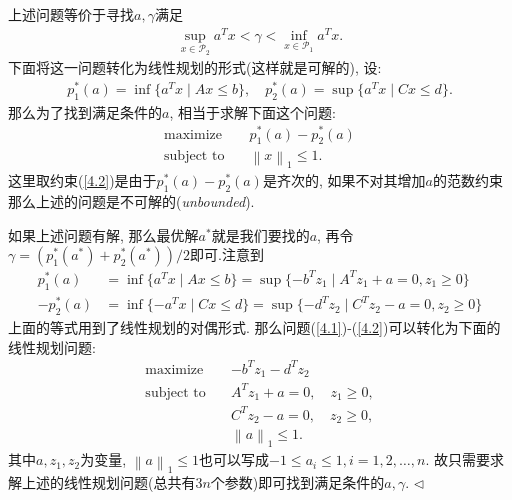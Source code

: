 \documentclass[11pt]{article}
\newenvironment{answer}[1][Answer]{\begin{trivlist}
\item[\hskip \labelsep{\bfseries\itshape#1.}\hskip \labelsep]}{\hfill$\lhd$\end{trivlist}}
\DeclareMathOperator*{\maximize}{maximize}
\begin{document}
\begin{answer}
    上述问题等价于寻找$a, \gamma$满足
    \begin{align*}
        \sup_{x \in \mathcal{P}_2} a^T x < \gamma < \inf_{x \in \mathcal{P}_1} a^T x.
    \end{align*}
    下面将这一问题转化为线性规划的形式(这样就是可解的), 设:
    \begin{align*}
        p_1^*(a) = \inf \{a^T x \mid A x \leqslant b\}, \quad p_2^*(a) = \sup \{a^T x \mid C x \leqslant d\}.
    \end{align*}
    那么为了找到满足条件的$a$, 相当于求解下面这个问题:
    \begin{align}
        \maximize \quad & p_1^*(a) - p_2^*(a) \label{4.1} \\ 
        \text{subject to} \quad & \left\|x\right\|_1 \leqslant 1.  \label{4.2}
    \end{align} 
    这里取约束(\ref{4.2})是由于$p_1^*(a) - p_2^*(a)$是齐次的, 如果不对其增加$a$的范数约束那么上述的问题是不可解的(\emph{unbounded}). 
    
    如果上述问题有解, 那么最优解$a^*$就是我们要找的$a$, 再令$\gamma = (p_1^*(a^*) + p_2^*(a^*))/2$即可.注意到
    \begin{align*}
        p_1^*(a) &= \inf\{a^T x \mid Ax \leqslant b\} = \sup\{-b^T z_1 \mid A^T z_1 + a = 0, z_1 \geqslant 0\} \\
        -p_2^*(a) &= \inf\{-a^T x \mid Cx \leqslant d\} = \sup\{-d^T z_2 \mid C^T z_2 - a = 0, z_2 \geqslant 0\} 
    \end{align*}
    上面的等式用到了线性规划的对偶形式. 那么问题(\ref{4.1})-(\ref{4.2})可以转化为下面的线性规划问题:
    \begin{align*}
        \maximize \quad & -b^T z_1 - d^T z_2 \\
        \text{subject to} \quad & A^T z_1 + a = 0, \quad z_1 \geqslant 0, \\
        & C^T z_2 - a = 0, \quad z_2 \geqslant 0, \\
        & \left\|a\right\|_1 \leqslant 1. 
    \end{align*}
    其中$a, z_1, z_2$为变量, $\left\|a\right\|_1 \leqslant 1$也可以写成$-1 \leqslant a_i \leqslant 1, i = 1, 2, \ldots, n$. 故只需要求解上述的线性规划问题(总共有$3n$个参数)即可找到满足条件的$a, \gamma$. 
\end{answer}
\end{document}
